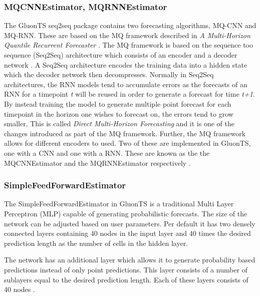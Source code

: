 \subsubsection{MQCNNEstimator, MQRNNEstimator}
The GluonTS seq2seq package contains two forecasting algorithms, MQ-CNN and MQ-RNN. These are based on the MQ framework described in \textit{A Multi-Horizon Quantile Recurrent Forecaster} \cite{wen_multi-horizon_2018}. The MQ framework is based on the sequence too sequence (Seq2Seq) architecture  which consists of an encoder and a decoder network \cite{seq2seq}. A Seq2Seq architecture encodes the training data into a hidden state which the decoder network then decompresses. Normally in Seq2Seq architectures, the RNN models tend to accumulate errors as the forecasts of an RNN for a timepoint \textit{t} will be reused in order to generate a forecast for time \textit{t+1}. By instead training the model to generate multiple point forecast for each timepoint in the horizon one wishes to forecast on, the errors tend to grow smaller. This is called \textit{Direct Multi-Horizon Forecasting} and it is one of the changes introduced as part of the MQ framework. Further, the MQ framework allows for different encoders to used. Two of these are implemented in GluonTS, one with a CNN and one with a RNN. These are known as the the MQCNNEstimator and the MQRNNEstimator respectively \cite{gluonts-website}.

\subsubsection{SimpleFeedForwardEstimator}
\label{algo:simplefeedforward}
The SimpleFeedForwardEstimator in GluonTS is a traditional Multi Layer Perceptron (MLP) capable of generating probabilistic forecasts. The size of the network can be adjusted based on user parameters. Per default it has two densely connected layers containing 40 nodes in the input layer and 40 times the desired prediction length as the number of cells in the hidden layer.

The network has an additional layer which allows it to generate probability based predictions instead of only point predictions. This layer consists of a number of sublayers equal to the desired prediction length. Each of these layers consists of 40 nodes \cite{gluonts-github}.

